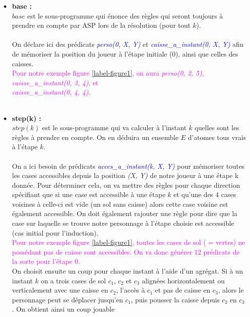 \documentclass[10pt,a4paper]{article}
\begin{document}
\begin{itemize}
	\item \textbf{base :}\\
		$base$ est le sous-programme qui énonce des règles qui seront toujours à prendre en compte par ASP lors de la résolution (pour tout $k$).\\ \\
		On déclare ici des prédicats \emph{\textcolor{blue}{perso(0, X, Y)}} et \emph{\textcolor{blue}{caisse\_a\_instant(0, X, Y)}} afin de mémoriser la position du joueur à l'étape initiale (0), ainsi que celles des 
		caisses.\\
		\textcolor{magenta}{Pour notre exemple figure \ref{label-figure1}, on aura \emph{perso(0, 2, 5), caisse\_a\_instant(0, 3, 4)}, et \\
		\emph{caisse\_a\_instant(0, 4, 4).}}\\ \\
	\item \textbf{step(k) :}\\
		$step(k)$ est le sous-programme qui va calculer à l'instant $k$ quelles sont les règles à prendre en compte. On en déduira un ensemble $E$ d'atomes tous vrais à l'étape $k$.\\ \\
		On a ici besoin de prédicats \emph{\textcolor{blue}{acces\_a\_instant(k, X, Y)}} pour mémoriser toutes les cases accessibles depuis la position \emph{(X, Y)} de notre joueur à une étape k donnée. Pour déterminer 
		cela, on va mettre des règles pour chaque direction spécifiant que si une case est accessible à une étape $k$ et qu'une des 4 cases voisines à celle-ci est vide (un sol sans caisse) alors cette case voisine est 
		également accessible. On doit également rajouter une règle pour dire que la case sur laquelle se trouve notre personnage à l'étape choisie est accessible (cas initial pour l'induction).\\
		\textcolor{magenta}{Pour notre exemple figure \ref{label-figure1}, toutes les cases de sol ( = vertes) ne possédant pas de caisse sont accessibles. On va donc générer 12 prédicats de la sorte pour l'étape 0.}\\
		On choisit ensuite un coup pour chaque instant à l'aide d'un agrégat. Si à un instant $k$ on a trois cases de sol $c_1$, $c_2$ et $c_3$ alignées horizontalement ou verticalement avec une caisse en $c_2$, l'accès à 
		$c_1$ et pas de caisse en $c_3$, alors le personnage peut se déplacer jusqu'en $c_1$, puis pousser la caisse depuis $c_2$ en $c_3$. On obtient ainsi un coup jouable 

\end{itemize}
\end{document}
